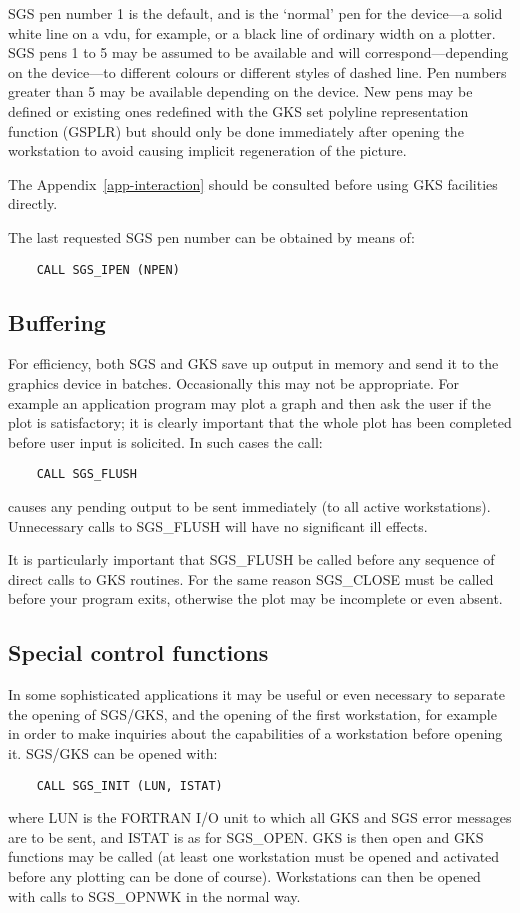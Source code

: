 SGS pen number 1 is the default, and is the `normal' pen for the
device---a solid white line on a vdu, for example, or a black
line of ordinary width on a plotter.  SGS pens 1 to 5
may be assumed to be available and will correspond---depending
on the device---to different colours or
different styles of dashed line. 
Pen numbers greater than 5 may be available depending
on the device.  New pens may be defined or existing ones redefined with
the GKS set polyline representation function (GSPLR) but should only
be done immediately after opening the workstation to avoid causing implicit
regeneration of the picture.

The Appendix~\ref{app-interaction} should be consulted before using GKS
facilities directly. 

The last requested SGS pen number can be obtained by means of:
\begin{verbatim}
    CALL SGS_IPEN (NPEN)
\end{verbatim}

\subsection {Buffering}

For efficiency, both SGS and GKS save up output
in memory and send it to the graphics device
in batches.  Occasionally
this may not be appropriate.  For example an application program
may plot a graph and then ask the user if the plot is
satisfactory;  it
is clearly important that the whole plot has been completed
before user input is
solicited.  In such cases the call:
\begin{verbatim}
    CALL SGS_FLUSH
\end{verbatim}
causes any pending output to be sent immediately (to all active
workstations).  Unnecessary calls to SGS\_FLUSH will have no significant
ill effects.

It is particularly important that SGS\_FLUSH be called
before any sequence of direct calls to GKS routines.
For the same reason SGS\_CLOSE must be called before your program exits,
otherwise the plot may be incomplete or even absent.

\subsection {Special control functions}\label{sec-special}

In some sophisticated applications it may be useful or even necessary to
separate the opening of SGS/GKS, and the opening of the first workstation,
for example in order to make inquiries about the capabilities of a workstation
before opening it. SGS/GKS can be opened with:
\begin{verbatim}
    CALL SGS_INIT (LUN, ISTAT)
\end{verbatim}
where LUN is the FORTRAN I/O unit to which all GKS and SGS error messages
are to be sent, and ISTAT is as for SGS\_OPEN.
GKS is then open and GKS functions
may be called (at least one workstation must be opened and activated before
any plotting can be done of course). Workstations can then be opened with
calls to SGS\_OPNWK in the normal way.

